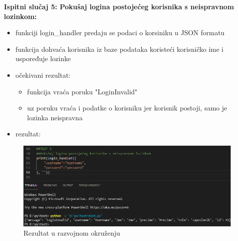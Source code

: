		\textbf{Ispitni slučaj 5: Pokušaj logina postojećeg korisnika s neispravnom lozinkom:}\\
\begin{itemize}
	\item funkciji login\_handler predaju se podaci o korsiniku u JSON formatu
	\item funkcija dohvaća korisnika iz baze podataka koristeći korisničko ime i uspoređuje lozinke 
	
	\item očekivani rezultat:\\
	\begin{itemize}
		\item funkcija vraća poruku "LoginInvalid" 
		\item uz poruku vraća i podatke o korisniku jer korisnik postoji, samo je lozinka neispravna
	\end{itemize}
	\item rezultat:
\end{itemize}
\begin{figure}[H]
	\centering
	\includegraphics[scale=0.5]{./slike/rez5.png}
	\caption{Rezultat u razvojnom okruženju}
	\label{fig:REZ5}
\end{figure}



